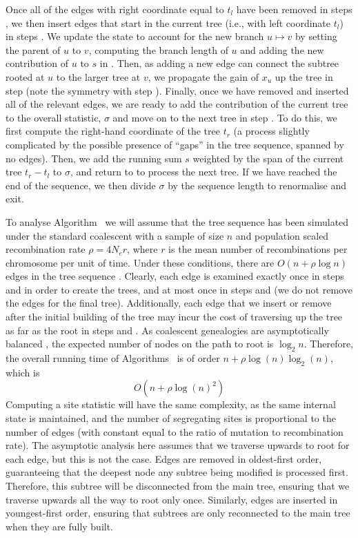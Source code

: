 \documentclass{article}
\begin{document}
Once all of the edges with right coordinate equal to $t_l$ have been removed in
steps , we then insert edges that start in the current tree
(i.e., with left coordinate $t_l$) in steps . We update the
state to account for the new branch $u \mapsto v$ by setting the parent of
$u$ to $v$, computing the branch length of $u$ and adding the new contribution
of $u$ to $s$ in . Then, as adding a new edge can connect the
subtree rooted at $u$ to the larger tree at $v$, we propagate the gain of $x_u$
up the tree in step  (note the symmetry with step ).
Finally, once we have removed and inserted all of the relevant edges, we are
ready to add the contribution of the current tree to the overall statistic,
$\sigma$ and move on to the next tree in step . To do this, we first
compute the right-hand coordinate of the tree $t_r$ (a process slightly
complicated by the possible presence of ``gaps'' in the tree sequence, spanned
by no edges). Then, we add the running sum $s$ weighted by the span of the
current tree $t_r - t_l$ to $\sigma$, and return to  to process the
next tree. If we have reached the end of the sequence, we then divide $\sigma$
by the sequence length to renormalise and exit.

To analyse Algorithm~ we will assume that the tree sequence has
been simulated under the standard coalescent with a sample of size
$n$ and population scaled recombination rate $\rho = 4 N_e r$,
where $r$ is the mean number of recombinations per chromosome per unit of time.
Under these conditions, there are $O(n + \rho \log n)$ edges in the tree sequence
\citep{kelleher2016efficient}.  Clearly, each edge is examined
exactly once in steps  and  in order to create
the trees, and at most once in steps  and  (we do
not remove the edges for the final tree). Additionally, each edge that
we insert or remove after the initial building of the tree
may incur the cost of traversing up the tree as
far as the root in steps  and .
As coalescent genealogies are asymptotically
balanced \citep{li2013coalescent}, the expected number of nodes
on the path to root is $\log_2 n$.
Therefore, the overall running time
of Algorithms~ is of order $n + \rho \log(n) \log_2(n)$, which is
\begin{equation}\label{eqn:alg_complexity}
    O\left(n + \rho \log(n)^2 \right)
\end{equation}
Computing a site statistic will have the same complexity,
as the same internal state is maintained,
and the number of segregating sites is proportional to the number of edges
(with constant equal to the ratio of mutation to recombination rate).
The asymptotic analysis here assumes that we traverse upwards to root
for each edge, but this is not the case. Edges are removed in
oldest-first order, guaranteeing that the deepest node any subtree being
modified is processed first. Therefore, this subtree will be disconnected from the
main tree, ensuring that we traverse upwards all the way to root only once.
Similarly, edges are inserted in youngest-first order, ensuring that subtrees are only
reconnected to the main tree when they are fully built.
\end{document}

